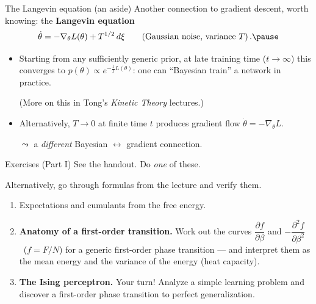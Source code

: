 \documentclass[11pt]{beamer}
\newcommand{\pd}{\partial}
\newcommand{\hl}[1]{{\color{blue!60!black}\textbf{#1}}}
\begin{document}
\begin{frame}{The Langevin equation (an aside)}
  Another connection to gradient descent, worth knowing: the
  \hl{Langevin equation}
  \[
    \dot\theta = -\nabla_\theta L(\theta) + T^{1/2}\, d\xi
    \qquad (\text{Gaussian noise, variance $T$})\,.  \pause
  \]
  \begin{itemize}
    \item Starting from any sufficiently generic prior, at late training time ($t\to \infty$) this
      converges to $p(\theta) \propto e^{-\frac1T L(\theta)}$: one can
      ``Bayesian train'' a network in practice.
      
      (More on this in Tong's \emph{Kinetic Theory} lectures.) \pause
    \item Alternatively, $T\to0$ at finite time $t$ produces gradient flow $\dot\theta = -\nabla_\theta L$.
    
    \medskip
    $\leadsto$ a \emph{different} Bayesian $\leftrightarrow$ gradient connection.
  \end{itemize}
\end{frame}

\begin{frame}{Exercises (Part I)}
  See the handout. Do \emph{one} of these.
  
  Alternatively, go through formulas from the lecture and verify them.
  
  \vspace{3mm}
  \begin{enumerate}
    \item[0.] Expectations and cumulants from the free energy.
    \item[1.] \textbf{Anatomy of a first-order transition.} Work out the
      curves $\dfrac{\pd f}{\pd\beta}$ and $-\dfrac{\pd^2 f}{\pd\beta^2}$
      \ ($f = F/N$) for a generic first-order phase transition ---
      and interpret them as the mean energy and the variance of the
      energy (heat capacity).
      \vspace{2mm}
    \item[2.] \textbf{The Ising perceptron.} Your turn! Analyze a simple learning problem and discover a first-order phase transition to perfect generalization.
  \end{enumerate}
  \vspace{4mm}
  \begin{center}
  \end{center}
\end{frame}
\end{document}
